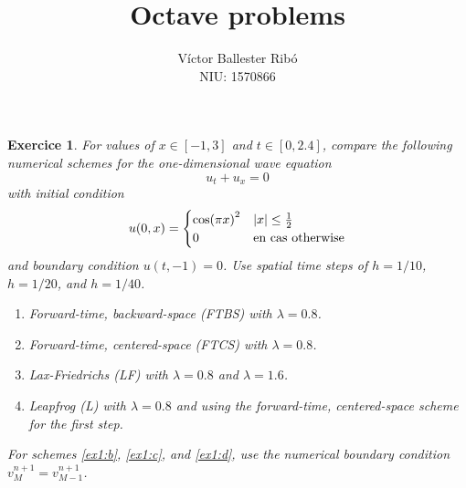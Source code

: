 \documentclass[10pt,a4paper]{article}
\title{\bfseries\Large Octave problems}
\author{Víctor Ballester Ribó\\NIU: 1570866}
\date{\parbox{\linewidth}{\centering
  Integració numèrica d'equacions en derivades parcials\endgraf
  Grau en Matemàtiques\endgraf
  Universitat Autònoma de Barcelona\endgraf
  Febrer de 2023}}
\newtheorem{exercici}{Exercice}
\theoremstyle{definition}
\theoremstyle{remark}
\begin{document}
\maketitle
\begin{exercici}
  For values of $x\in[-1,3]$ and $t\in [0,2.4]$, compare the following numerical schemes for the one-dimensional wave equation
  $$
    u_t+u_x=0
  $$
  with initial condition
  $$
    u(0,x)=\begin{cases}
      {\cos(\pi x)}^2 & \abs{x}\leq \frac{1}{2} \\
      0               & \text{en cas otherwise}
    \end{cases}
  $$
  and boundary condition $u(t,-1)=0$. Use spatial time steps of $h=1/10$, $h=1/20$, and $h=1/40$.
  \begin{enumerate}
    \item Forward-time, backward-space (FTBS) with $\lambda =0.8$.
          \item\label{ex1:b} Forward-time, centered-space (FTCS) with $\lambda =0.8$.
          \item\label{ex1:c} Lax-Friedrichs (LF) with $\lambda =0.8$ and $\lambda =1.6$.
          \item\label{ex1:d} Leapfrog (L) with $\lambda =0.8$ and using the forward-time, centered-space scheme for the first step.
  \end{enumerate}
  For schemes \ref{ex1:b}, \ref{ex1:c}, and \ref{ex1:d}, use the numerical boundary condition $v_M^{n+1}=v_{M-1}^{n+1}$.
\end{exercici}
\end{document}
